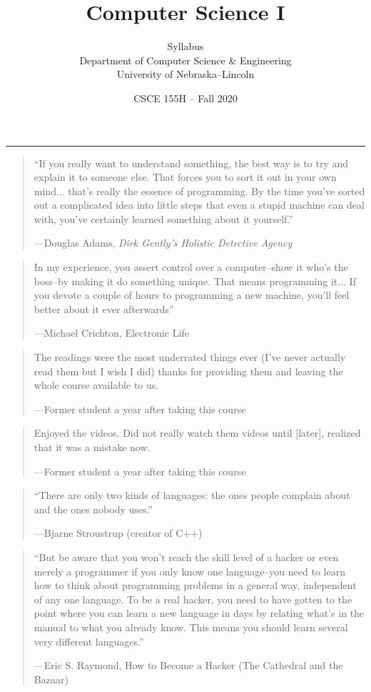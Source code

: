 \documentclass[12pt]{scrartcl}
\title{Computer Science I}\let\Title\@title
\subtitle{Syllabus\\
{\small
\vskip1cm
Department of Computer Science \& Engineering \\
University of Nebraska--Lincoln}
\vskip-1cm}
\date{CSCE 155H -- Fall 2020}
\begin{document}
\maketitle


\hrule

\begin{quote}
``If you really want to understand something, the best way is to try and explain it to someone else. That forces you to sort it out in your own mind... that's really the essence of programming. By the time you've sorted out a complicated idea into little steps that even a stupid machine can deal with, you've certainly learned something about it yourself.'' 

\hfill ---Douglas Adams, \emph{Dirk Gently's Holistic Detective Agency}
\end{quote}

\begin{quote}
In my experience, you assert control over a computer--show it who's the boss--by making it do something unique. That means programming it... If you devote a couple of hours to programming a new machine, you'll feel better about it ever afterwards'' 

\hfill ---Michael Crichton, Electronic Life
\end{quote}

\begin{quote}
The readings were the most underrated things ever (I've never actually read them but I wish I did) thanks for providing them and leaving the whole course available to us. 

\hfill ---Former student a year after taking this course
\end{quote}

\begin{quote}
Enjoyed the videos. Did not really watch them videos until [later],
realized that it was a mistake now.

\hfill ---Former student a year after taking this course
\end{quote}

\begin{quote}
``There are only two kinds of languages: the ones people complain 
about and the ones nobody uses.''

\hfill ---Bjarne Stroustrup (creator of C++)
\end{quote}

\begin{quote}
``But be aware that you won't reach the skill level of a hacker or 
even merely a programmer if you only know one language--you need to 
learn how to think about programming problems in a general way, 
independent of any one language.  To be a real hacker, you need to 
have gotten to the point where you can learn a new language in days 
by relating what's in the manual to what you already know.  This 
means you should learn several very different languages.''

\hfill ---Eric S. Raymond, How to Become a Hacker (The Cathedral and the Bazaar)
\end{quote}
\end{document}
